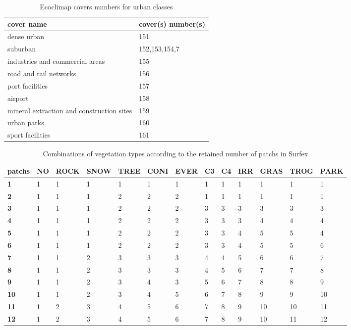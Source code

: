 \begin{table}[htbp]
\begin{center}
\begin{tabular}{|l|l| }
\hline
\textbf{cover name} & \textbf{cover(s) number(s)} \\
\hline
dense urban & 151 \\
\hline 
suburban & 152,153,154,7 \\
\hline
industries and commercial areas & 155 \\
\hline
road and rail networks & 156 \\
\hline
port facilities & 157 \\
\hline
airport & 158 \\
\hline
mineral extraction and construction sites & 159 \\
\hline
urban parks & 160 \\
\hline
sport facilities & 161 \\
\hline
\end{tabular}
\end{center}
\caption{Ecoclimap covers numbers for urban classes}
\label{tab5}
\end{table}

\begin{table}[htbp]
\begin{center}
\begin{tabular}{|l|l|l|l|l|l|l|l|l|l|l|l|l|}
\hline
\textbf{patchs} & \textbf{NO} & \textbf{ROCK} & \textbf{SNOW} & \textbf{TREE} & \textbf{CONI} & \textbf{EVER} & \textbf{C3} & \textbf{C4} & \textbf{IRR} & \textbf{GRAS} & \textbf{TROG} & \textbf{PARK} \\
\hline
\textbf{1} & 1 & 1 & 1 & 1 & 1 & 1 & 1 & 1 & 1 & 1 & 1 & 1 \\
\hline
\textbf{2} & 1 & 1 & 1 & 2 & 2 & 2 & 1 & 1 & 1 & 1 & 1 & 1 \\
\hline
\textbf{3} & 1 & 1 & 1 & 2 & 2 & 2 & 3 & 3 & 3 & 3 & 3 & 3 \\
\hline
\textbf{4} & 1 & 1 & 1 & 2 & 2 & 2 & 3 & 3 & 3 & 4 & 4 & 4 \\
\hline
\textbf{5} & 1 & 1 & 1 & 2 & 2 & 2 & 3 & 3 & 4 & 5 & 5 & 4 \\
\hline
\textbf{6} & 1 & 1 & 1 & 2 & 2 & 2 & 3 & 3 & 4 & 5 & 5 & 6 \\
\hline
\textbf{7} & 1 & 1 & 2 & 3 & 3 & 3 & 4 & 4 & 5 & 6 & 6 & 7 \\
\hline
\textbf{8} & 1 & 1 & 2 & 3 & 3 & 3 & 4 & 5 & 6 & 7 & 7 & 8 \\
\hline
\textbf{9} & 1 & 1 & 2 & 3 & 4 & 3 & 5 & 6 & 7 & 8 & 8 & 9 \\
\hline
\textbf{10} & 1 & 1 & 2 & 3 & 4 & 5 & 6 & 7 & 8 & 9 & 9 & 10 \\
\hline
\textbf{11} & 1 & 2 & 3 & 4 & 5 & 6 & 7 & 8 & 9 & 10 & 10 & 11 \\
\hline
\textbf{12} & 1 & 2 & 3 & 4 & 5 & 6 & 7 & 8 & 9 & 10 & 11 & 12 \\
\hline
\end{tabular}
\end{center}
\caption{Combinations of vegetation types according to the retained number of patchs in Surfex}
\label{tab7}
\end{table}

